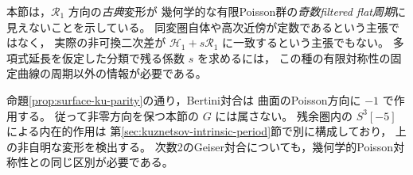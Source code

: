 \begin{remark}[内在的対合との区別と計算上の帰結]
\label{rem:ku-poisson-symmetry-limit}
本節は，$\mathcal R_1$ 方向の\emph{古典}変形が
幾何学的な有限Poisson群の\emph{奇数filtered flat周期}に見えないことを示している。
同変圏自体や高次近傍が定数であるという主張ではなく，
実際の非可換二次差が $\mathcal H_1+s\mathcal R_1$ に一致するという主張でもない。
多項式延長を仮定した分類で残る係数 $s$ を求めるには，
この種の有限対称性の固定曲線の周期以外の情報が必要である。

命題\ref{prop:surface-ku-parity}の通り，Bertini対合は
曲面のPoisson方向に $-1$ で作用する。
従って非零方向を保つ本節の $G$ には属さない。
残余圏内の $S^3[-5]$ による内在的作用は
第\ref{sec:kuznetsov-intrinsic-period}節で別に構成しており，
上の非自明な変形を検出する。
次数2のGeiser対合についても，幾何学的Poisson対称性との同じ区別が必要である。
\end{remark}
